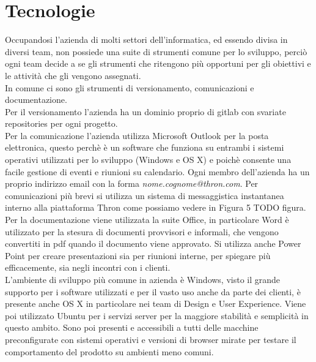 \documentclass[a4paper, 12pt, twoside, openright]{book}
\begin{document}
\section{Tecnologie}
Occupandosi l'azienda di molti settori dell'informatica, ed essendo divisa in diversi team, non possiede una suite di strumenti comune per lo sviluppo, perciò ogni team decide a se gli strumenti che ritengono più opportuni per gli obiettivi e le attività che gli vengono assegnati.\\
In comune ci sono gli strumenti di versionamento, comunicazioni e documentazione.\\
Per il versionamento l'azienda ha un dominio proprio di gitlab con svariate repositories per ogni progetto.\\
Per la comunicazione l'azienda utilizza Microsoft Outlook per la posta elettronica, questo perchè è un software che funziona su entrambi i sistemi operativi utilizzati per lo sviluppo (Windows e OS X) e poichè consente una facile gestione di eventi e riunioni su calendario. Ogni membro dell'azienda ha un proprio indirizzo email con la forma \textit{nome.cognome@thron.com}. Per comunicazioni più brevi si utilizza un sistema di messaggistica instantanea interno alla piattaforma Thron come possiamo vedere in Figura 5 TODO figura.\\
Per la documentazione viene utilizzata la suite Office, in particolare Word è utilizzato per la stesura di documenti provvisori e informali, che vengono convertiti in pdf quando il documento viene approvato. Si utilizza anche Power Point per creare presentazioni sia per riunioni interne, per spiegare più efficacemente, sia negli incontri con i clienti.\\
L'ambiente di sviluppo più comune in azienda è Windows, visto il grande supporto per i software utilizzati e per il vasto uso anche da parte dei clienti, è presente anche OS X in particolare nei team di Design e User Experience. Viene poi utilizzato Ubuntu per i servizi server per la maggiore stabilità e semplicità in questo ambito. Sono poi presenti e accessibili a tutti delle macchine preconfigurate con sistemi operativi e versioni di browser mirate per testare il comportamento del prodotto su ambienti meno comuni.
\end{document}
